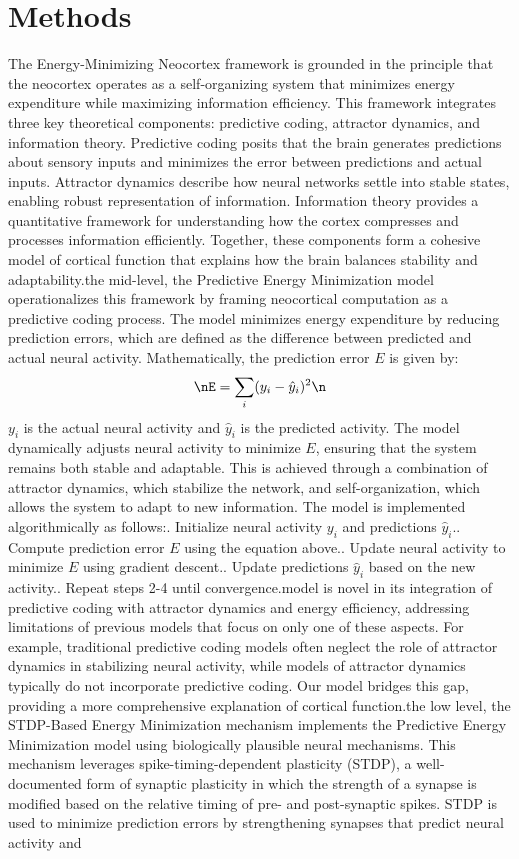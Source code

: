 \documentclass{article}
\begin{document}
\section{Methods}
The Energy-Minimizing Neocortex framework is grounded in the principle that the neocortex operates as a self-organizing system that minimizes energy expenditure while maximizing information efficiency. This framework integrates three key theoretical components: predictive coding, attractor dynamics, and information theory. Predictive coding posits that the brain generates predictions about sensory inputs and minimizes the error between predictions and actual inputs. Attractor dynamics describe how neural networks settle into stable states, enabling robust representation of information. Information theory provides a quantitative framework for understanding how the cortex compresses and processes information efficiently. Together, these components form a cohesive model of cortical function that explains how the brain balances stability and adaptability.\n\nAt the mid-level, the Predictive Energy Minimization model operationalizes this framework by framing neocortical computation as a predictive coding process. The model minimizes energy expenditure by reducing prediction errors, which are defined as the difference between predicted and actual neural activity. Mathematically, the prediction error \(E\) is given by:\n\begin{equation}\nE = \sum_{i} (y_i - \hat{y}_i)^2\n\end{equation}\nwhere \(y_i\) is the actual neural activity and \(\hat{y}_i\) is the predicted activity. The model dynamically adjusts neural activity to minimize \(E\), ensuring that the system remains both stable and adaptable. This is achieved through a combination of attractor dynamics, which stabilize the network, and self-organization, which allows the system to adapt to new information. The model is implemented algorithmically as follows:\n{}. Initialize neural activity \(y_i\) and predictions \(\hat{y}_i\).. Compute prediction error \(E\) using the equation above.. Update neural activity to minimize \(E\) using gradient descent.. Update predictions \(\hat{y}_i\) based on the new activity.. Repeat steps 2-4 until convergence.\n\nThis model is novel in its integration of predictive coding with attractor dynamics and energy efficiency, addressing limitations of previous models that focus on only one of these aspects. For example, traditional predictive coding models often neglect the role of attractor dynamics in stabilizing neural activity, while models of attractor dynamics typically do not incorporate predictive coding. Our model bridges this gap, providing a more comprehensive explanation of cortical function.\n\nAt the low level, the STDP-Based Energy Minimization mechanism implements the Predictive Energy Minimization model using biologically plausible neural mechanisms. This mechanism leverages spike-timing-dependent plasticity (STDP), a well-documented form of synaptic plasticity in which the strength of a synapse is modified based on the relative timing of pre- and post-synaptic spikes. STDP is used to minimize prediction errors by strengthening synapses that predict neural activity and 
\end{document}
